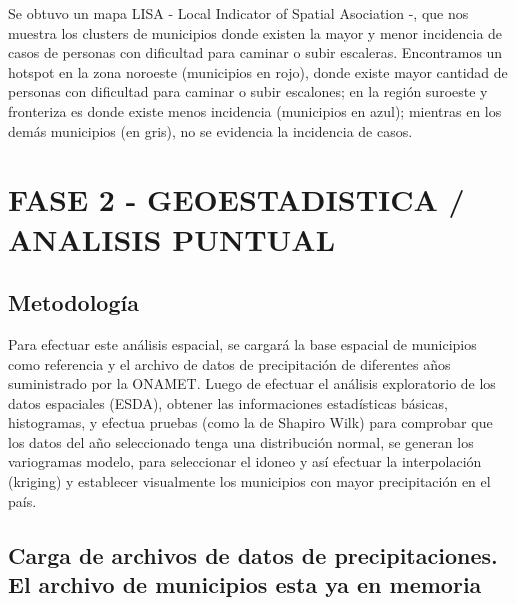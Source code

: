 \documentclass[11pt,]{article}
\begin{document}
Se obtuvo un mapa LISA - Local Indicator of Spatial Asociation -, que
nos muestra los clusters de municipios donde existen la mayor y menor
incidencia de casos de personas con dificultad para caminar o subir
escaleras. Encontramos un hotspot en la zona noroeste (municipios en
rojo), donde existe mayor cantidad de personas con dificultad para
caminar o subir escalones; en la región suroeste y fronteriza es donde
existe menos incidencia (municipios en azul); mientras en los demás
municipios (en gris), no se evidencia la incidencia de casos.

\section{FASE 2 - GEOESTADISTICA / ANALISIS
PUNTUAL}\label{fase-2---geoestadistica-analisis-puntual}

\subsection{Metodología}\label{metodologuxeda-1}

Para efectuar este análisis espacial, se cargará la base espacial de
municipios como referencia y el archivo de datos de precipitación de
diferentes años suministrado por la ONAMET. Luego de efectuar el
análisis exploratorio de los datos espaciales (ESDA), obtener las
informaciones estadísticas básicas, histogramas, y efectua pruebas (como
la de Shapiro Wilk) para comprobar que los datos del año seleccionado
tenga una distribución normal, se generan los variogramas modelo, para
seleccionar el idoneo y así efectuar la interpolación (kriging) y
establecer visualmente los municipios con mayor precipitación en el
país.

\subsection{Carga de archivos de datos de precipitaciones. El archivo de
municipios esta ya en
memoria}\label{carga-de-archivos-de-datos-de-precipitaciones.-el-archivo-de-municipios-esta-ya-en-memoria}
\end{document}
